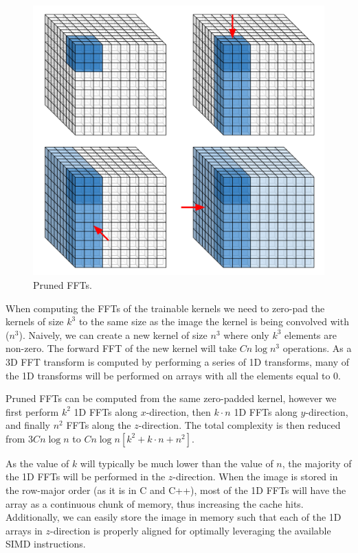 \documentclass[conference]{IEEEtran}
\begin{document}
\begin{figure}
  \begin{center}
  \includegraphics[width=0.8\columnwidth]{fig/pruned_ffts.pdf}
  \end{center}
  \caption{Pruned FFTs.}
  \label{fig:pruned_ffts}
\end{figure}


When computing the FFTs of the trainable kernels we need to zero-pad
the kernels of size $k^3$ to the same size as the image the kernel is
being convolved with ($n^3$).  Naively, we can create a new kernel of
size $n^3$ where only $k^3$ elements are non-zero.  The forward FFT of
the new kernel will take $C n\log n^3$ operations.  As a 3D FFT
transform is computed by performing a series of 1D transforms, many of
the 1D transforms will be performed on arrays with all the elements
equal to $0$.

Pruned FFTs can be computed from the same zero-padded kernel, however
we first perform $k^2$ 1D FFTs along $x$-direction, then $k \cdot n$
1D FFTs along $y$-direction, and finally $n^2$ FFTs along the
$z$-direction.  The total complexity is then reduced from $3C n\log n$
to $C n\log n[k^2 + k \cdot n + n^2]$.

As the value of $k$ will typically be much lower than the value of
$n$, the majority of the 1D FFTs will be performed in the
$z$-direction.  When the image is stored in the row-major order (as it
is in C and C++), most of the 1D FFTs will have the array as a
continuous chunk of memory, thus increasing the cache hits.
Additionally, we can easily store the image in memory such that each
of the 1D arrays in $z$-direction is properly aligned for optimally
leveraging the available SIMD instructions.
\end{document}
